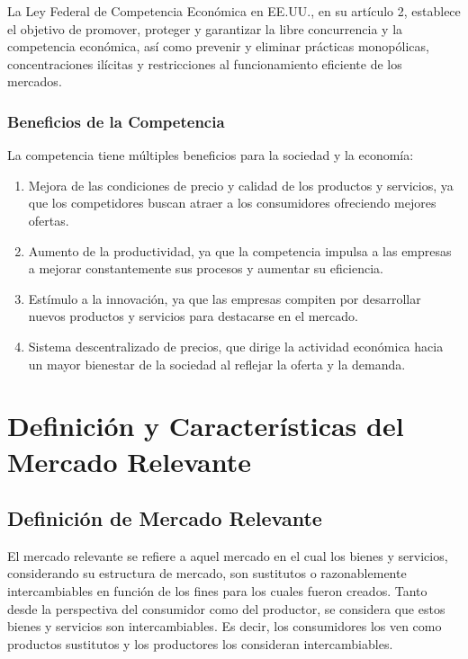 \documentclass[
  a4paper,
]{article}
\providecommand{\tightlist}{%
  \setlength{\itemsep}{0pt}\setlength{\parskip}{0pt}}\usepackage{longtable,booktabs,array}
\begin{document}
La Ley Federal de Competencia Económica en EE.UU., en su artículo 2,
establece el objetivo de promover, proteger y garantizar la libre
concurrencia y la competencia económica, así como prevenir y eliminar
prácticas monopólicas, concentraciones ilícitas y restricciones al
funcionamiento eficiente de los mercados.

\hypertarget{beneficios-de-la-competencia}{%
\subsubsection{Beneficios de la
Competencia}\label{beneficios-de-la-competencia}}

La competencia tiene múltiples beneficios para la sociedad y la
economía:

\begin{enumerate}
\def\labelenumi{\arabic{enumi}.}
\tightlist
\item
  Mejora de las condiciones de precio y calidad de los productos y
  servicios, ya que los competidores buscan atraer a los consumidores
  ofreciendo mejores ofertas.
\item
  Aumento de la productividad, ya que la competencia impulsa a las
  empresas a mejorar constantemente sus procesos y aumentar su
  eficiencia.
\item
  Estímulo a la innovación, ya que las empresas compiten por desarrollar
  nuevos productos y servicios para destacarse en el mercado.
\item
  Sistema descentralizado de precios, que dirige la actividad económica
  hacia un mayor bienestar de la sociedad al reflejar la oferta y la
  demanda.
\end{enumerate}

\hypertarget{definiciuxf3n-y-caracteruxedsticas-del-mercado-relevante}{%
\section{Definición y Características del Mercado
Relevante}\label{definiciuxf3n-y-caracteruxedsticas-del-mercado-relevante}}

\hypertarget{definiciuxf3n-de-mercado-relevante}{%
\subsection{Definición de Mercado
Relevante}\label{definiciuxf3n-de-mercado-relevante}}

El mercado relevante se refiere a aquel mercado en el cual los bienes y
servicios, considerando su estructura de mercado, son sustitutos o
razonablemente intercambiables en función de los fines para los cuales
fueron creados. Tanto desde la perspectiva del consumidor como del
productor, se considera que estos bienes y servicios son
intercambiables. Es decir, los consumidores los ven como productos
sustitutos y los productores los consideran intercambiables.
\end{document}
